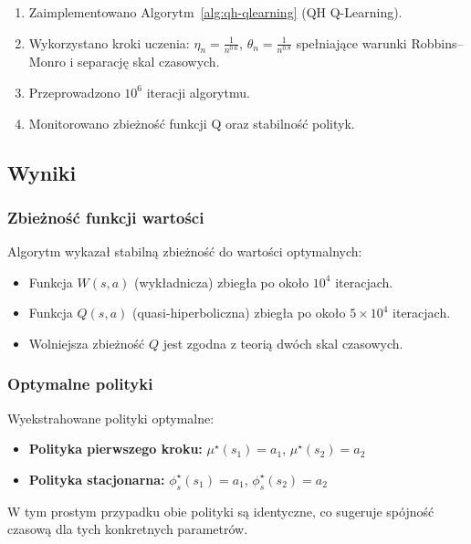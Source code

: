 \begin{enumerate}
\item Zaimplementowano Algorytm~\ref{alg:qh-qlearning} (QH Q-Learning).
\item Wykorzystano kroki uczenia: $\eta_n = \frac{1}{n^{0.6}}$, $\theta_n = \frac{1}{n^{0.8}}$ spełniające warunki Robbins--Monro i separację skal czasowych.
\item Przeprowadzono $10^6$ iteracji algorytmu.
\item Monitorowano zbieżność funkcji Q oraz stabilność polityk.
\end{enumerate}

\subsection{Wyniki}

\subsubsection{Zbieżność funkcji wartości}

Algorytm wykazał stabilną zbieżność do wartości optymalnych:

\begin{itemize}
\item Funkcja $W(s,a)$ (wykładnicza) zbiegła po około $10^4$ iteracjach.
\item Funkcja $Q(s,a)$ (quasi-hiperboliczna) zbiegła po około $5 \times 10^4$ iteracjach.
\item Wolniejsza zbieżność $Q$ jest zgodna z teorią dwóch skal czasowych.
\end{itemize}

\subsubsection{Optymalne polityki}

Wyekstrahowane polityki optymalne:

\begin{itemize}
\item \textbf{Polityka pierwszego kroku:} $\mu^\star(s_1) = a_1$, $\mu^\star(s_2) = a_2$
\item \textbf{Polityka stacjonarna:} $\phi_s^\star(s_1) = a_1$, $\phi_s^\star(s_2) = a_2$
\end{itemize}

W tym prostym przypadku obie polityki są identyczne, co sugeruje spójność czasową dla tych konkretnych parametrów.

